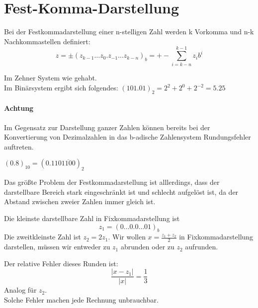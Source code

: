 \section{Fest-Komma-Darstellung}
\begin{definition}
	Bei der Festkommadarstellung einer n-stelligen Zahl werden k Vorkomma und n-k Nachkommastellen definiert:
	\[
	z=\pm (z_{k-1} \ldots z_0.z_{-1} \ldots z_{k-n})_b = +- \sum_{i=k-n}^{k-1}z_i b^{i}
	\]

\end{definition}
\begin{example}
Im Zehner System wie gehabt.\\
Im Binärsystem ergibt sich folgendes: $(101.01)_2= 2^{2}+ 2^{0}+ 2^{-2}=5.25$
\end{example}
\paragraph{Achtung} Im Gegensatz zur Darstellung ganzer Zahlen können bereits bei der Konvertierung von Dezimalzahlen in das b-adische Zahlensystem Rundungsfehler auftreten.
\begin{example}
	$(0.8)_{10}=(0.110\overline{1100})_2$
\end{example}
Das größte Problem der Festkommadarstellung ist alllerdings, dass der darstellbare Bereich stark eingeschränkt ist und schlecht aufgelöst ist, da der Abstand zwischen zweier Zahlen immer gleich ist.
\begin{example}
Die kleinste darstellbare Zahl in Fixkommadarstellung ist \[
z_1=(0 \ldots 0.0 \ldots 0 1)_b
\]
Die zweitkleinste Zahl ist $z_2=2z_1$. Wir wollen $x=\frac{z_1+z_2}{2}$ in Fixkommadarstellung darstellen, müssen wir entweder zu $z_1$ abrunden oder zu $z_2$ aufrunden.
\end{example}
\begin{fluff}
Der relative Fehler dieses Runden ist:
\[
\frac{|x-z_1|}{|x|}=\frac{1}{3}
\]
Analog für $z_2$. \\
Solche Fehler machen jede Rechnung unbrauchbar.
\end{fluff}

